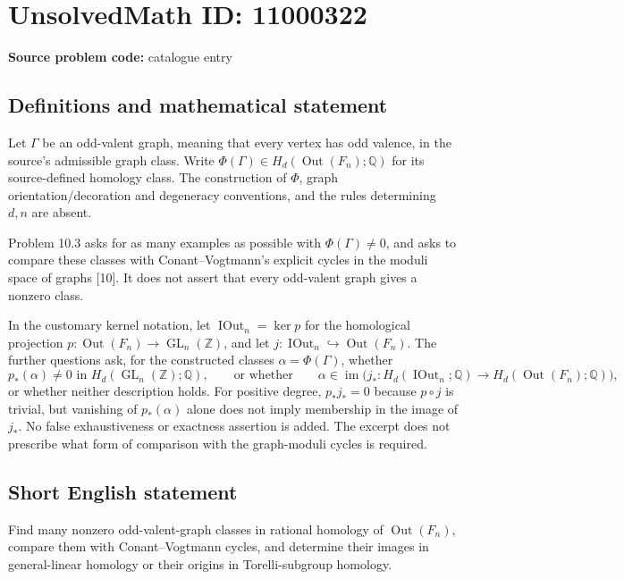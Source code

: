 \documentclass[11pt]{article}
\newcommand{\Z}{\mathbb{Z}}
\newcommand{\Q}{\mathbb{Q}}
\begin{document}
\section*{UnsolvedMath ID: 11000322}
\textbf{Source problem code:} catalogue entry
\subsection{Definitions and mathematical statement}
Let $\Gamma$ be an odd-valent graph, meaning that every vertex has odd valence, in the source's admissible graph class. Write $\Phi(\Gamma)\in H_d(\operatorname{Out}(F_n);\Q)$ for its source-defined homology class. The construction of $\Phi$, graph orientation/decoration and degeneracy conventions, and the rules determining $d,n$ are absent.

Problem 10.3 asks for as many examples as possible with $\Phi(\Gamma)\ne0$, and asks to compare these classes with Conant--Vogtmann's explicit cycles in the moduli space of graphs [10]. It does not assert that every odd-valent graph gives a nonzero class.

In the customary kernel notation, let $\operatorname{IOut}_n=\ker p$ for the homological projection $p:\operatorname{Out}(F_n)\to\operatorname{GL}_n(\Z)$, and let $j:\operatorname{IOut}_n\hookrightarrow\operatorname{Out}(F_n)$. The further questions ask, for the constructed classes $\alpha=\Phi(\Gamma)$, whether
\[
 p_*(\alpha)\ne0\text{ in }H_d(\operatorname{GL}_n(\Z);\Q),
 \qquad\text{or whether}\qquad
 \alpha\in\operatorname{im}\bigl(j_*:H_d(\operatorname{IOut}_n;\Q)
 \to H_d(\operatorname{Out}(F_n);\Q)\bigr),
\]
or whether neither description holds. For positive degree, $p_*j_*=0$ because $p\circ j$ is trivial, but vanishing of $p_*(\alpha)$ alone does not imply membership in the image of $j_*$. No false exhaustiveness or exactness assertion is added. The excerpt does not prescribe what form of comparison with the graph-moduli cycles is required.
\subsection{Short English statement}
Find many nonzero odd-valent-graph classes in rational homology of $\operatorname{Out}(F_n)$, compare them with Conant--Vogtmann cycles, and determine their images in general-linear homology or their origins in Torelli-subgroup homology.
\end{document}
